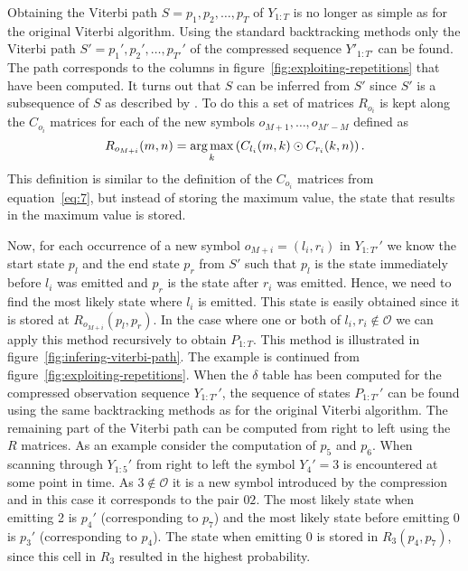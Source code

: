 Obtaining the Viterbi path $S = p_1, p_2, \dots, p_T$ of $Y_{1:T}$ is no longer
as simple as for the original Viterbi algorithm. Using the standard
backtracking methods only the Viterbi path $S' = p_1', p_2', \dots, p_{T'}'$
of the compressed sequence $Y'_{1:T'}$ can be found. The path corresponds to
the columns in figure~\ref{fig:exploiting-repetitions} that have been
computed. It turns out that $S$ can be inferred from $S'$ since $S'$
is a subsequence of $S$ as described by \citet{lifshits2009speeding}. To do
this a set of matrices $R_{o_i}$ is kept along the $C_{o_i}$ matrices for each
of the new symbols $o_{M + 1}, \dots, o_{M' - M}$ defined as
\begin{equation*}
  R_{o_{M + i}}(m, n) = \operatorname*{arg\,max}_k
  \left(
    C_{l_i}(m, k) \odot C_{r_i}(k, n)
  \right).
\end{equation*}
This definition is similar to the definition of the $C_{o_i}$ matrices from
equation~\eqref{eq:7}, but instead of storing the maximum value, the state that
results in the maximum value is stored.

Now, for each occurrence of a new symbol $o_{M + i} = (l_i, r_i)$ in
$Y_{1:T'}'$ we know the start state $p_l$ and the end state $p_r$ from $S'$
such that $p_l$ is the state immediately before $l_i$ was emitted and $p_r$ is
the state after $r_i$ was emitted. Hence, we need to find the most likely state
where $l_i$ is emitted. This state is easily obtained since it is stored at
$R_{o_{M + i}}(p_l, p_r)$. In the case where one or both of
$l_i, r_i \not \in \mathcal{O}$ we can apply this method recursively to obtain
$P_{1:T}$. This method is illustrated in
figure~\ref{fig:infering-viterbi-path}. The example is continued from
figure~\ref{fig:exploiting-repetitions}. When the $\delta$ table has been
computed for the compressed observation sequence $Y_{1:T'}'$, the sequence of
states $P_{1:T'}'$ can be found using the same backtracking methods as for the
original Viterbi algorithm. The remaining part of the Viterbi path can be
computed from right to left using the $R$ matrices. As an example consider the
computation of $p_5$ and $p_6$. When scanning through $Y_{1:5}'$ from right to
left the symbol $Y_4' = 3$ is encountered at some point in time. As
$3 \not \in \mathcal{O}$ it is a new symbol introduced by the compression and
in this case it corresponds to the pair $02$. The most likely state when
emitting 2 is $p_4'$ (corresponding to $p_7$) and the most likely state before
emitting 0 is $p_3'$ (corresponding to $p_4$). The state when emitting 0 is
stored in $R_3(p_4, p_7)$, since this cell in $R_3$ resulted in the highest
probability.

